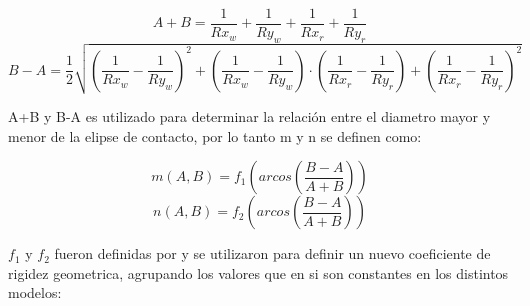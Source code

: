 \documentclass[main]{subfiles}
\begin{document}
\begin{equation}
	A+B=\frac{1}{Rx_w}+\frac{1}{Ry_w}+\frac{1}{Rx_r}+\frac{1}{Ry_r}
\end{equation}
\begin{equation}
	B-A=\frac{1}{2}
\sqrt{
\left( \frac{1}{Rx_w}-\frac{1}{Ry_w}\right) ^2
+\left( \frac{1}{Rx_w}-\frac{1}{Ry_w}\right) \cdot \left(\frac{1}{Rx_r}-\frac{1}{Ry_r}\right) 
+\left( \frac{1}{Rx_r}-\frac{1}{Ry_r}\right) ^2
}
\end{equation}

A+B y B-A es utilizado para determinar la relación entre el diametro mayor y menor de la elipse de contacto, por lo tanto m y n se definen como:

\begin{equation}
m(A,B)=f_1\left( arcos\left(\frac{B-A}{A+B} \right)\right)
\end{equation}
\begin{equation}
n(A,B)=f_2\left( arcos\left(\frac{B-A}{A+B} \right)\right)
\end{equation}

$f_1$ y $f_2$ fueron definidas por \citet{Herz1881} y se utilizaron para definir un nuevo coeficiente de rigidez geometrica, agrupando los valores que en si son constantes en los distintos modelos:
\end{document}
